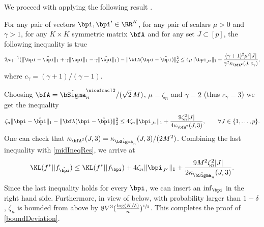 We proceed with applying the following result \citep[Lemma 2]{BDGP}.

\begin{lemma}
For any pair of vectors $\bpi,\bpi'\in\RR^K$, for any pair of scalars $\mu>0$ and $\gamma>1$, for any $K\times K$
symmetric matrix $\bfA$ and for any set $J \subset [p]$, the following inequality is true
\begin{equation}
   2\mu\gamma^{-1}(\| \bpi-\hat\bpi\|_1 + \gamma \|\bpi\|_1 - \gamma \|\hat\bpi\|_1 )-\|\bfA(\bpi-\hat\bpi)\|_2^2 \leq
  4\mu \| \bpi_{J^c}\|_1 + \frac{(\gamma+1)^2\mu^2|J|}{\gamma^2\kappa_{\bfA^2}(J,c_{\gamma})},
\end{equation}
where $c_{\gamma}=(\gamma+1)/(\gamma-1)$.
\end{lemma}


Choosing $\bfA = \hat\bSigma_n^{\nicefrac12}/(\sqrt{2}\,M)$, $\mu=\zeta_n$ and $\gamma=2$ (thus $c_\gamma = 3$)
we get the inequality
\begin{equation}
  \zeta_n\| \bpi-\hat\bpi\|_1-\|\bfA(\bpi-\hat\bpi)\|_2^2 \leq
  4\zeta_n\| \bpi_{J^c}\|_1 + \frac{9\zeta_n^2|J|}{4\kappa_{\bfA^2}(J,3)},\qquad \forall J \in \{1, \dots, p\}.
\end{equation}
One can check that $\kappa_{\bfA^2}(J,3) = \kappa_{\hat\bSigma_n}(J,3)/(2M^2)$.
Combining the last inequality with \eqref{midIneqRes}, we arrive at
\begin{equation}
\label{oracleIneqTh}
  \KL(f^*|| f_{\hat\bpi}) \leq \KL(f^*|| f_{\bpi}) + 4\zeta_n\| \bpi_{J^c}\|_1 + \frac{9M^2\zeta_n^2|J|}{2\kappa_{\hat\bSigma_n}(J,3)}.
\end{equation}
Since the last inequality holds for every $\bpi$, we can insert an $\inf_{\bpi}$ in the right hand side.
Furthermore, in view of  below, with probability larger than $1-\delta$, $\zeta_n$ is bounded from above
by $8V^3(\frac{\log(K/\delta)}{n})^{\nicefrac12}$. This completes the proof of \eqref{boundDeviation}.

